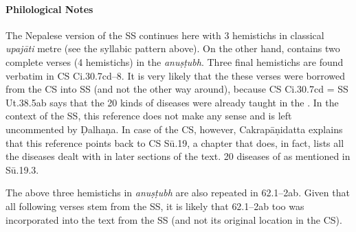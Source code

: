 \paragraph{Philological Notes} 
The Nepalese version of the SS continues here with 3 hemistichs in classical 
\emph{upajāti} metre (see the syllabic pattern above). On the other hand, 
\cite{vulgate} contains two complete verses (4 hemistichs) in the 
\emph{anuṣṭubh}. Three final hemistichs are found verbatim in CS Ci.30.7cd--8. It 
is very likely that the these verses were borrowed from the CS into SS (and not 
the other way around), because CS Ci.30.7cd = SS Ut.38.5ab says that the 20 
kinds of diseases were already taught in the . In the context of the SS, this reference does not make any sense and 
is left uncommented by Ḍalhaṇa. In case of the CS, however, Cakrapāṇidatta 
explains that this reference points back to CS Sū.19, a chapter that does, in fact, 
lists all the diseases dealt with in later sections of the text. 20 diseases of 
 as mentioned in Sū.19.3.

The above three hemistichs in \emph{anuṣṭubh} are also repeated in \cite{madhava} 
62.1--2ab. Given that all following verses stem from the SS, it is likely that 
\cite{madhava} 
62.1--2ab too was incorporated into the text from the SS (and not its original 
location in the CS).   


